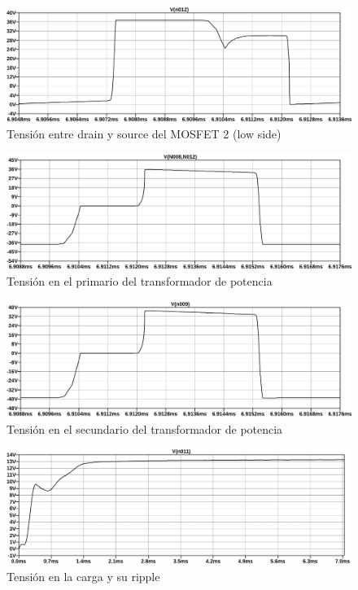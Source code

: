 \begin{figure}[ht]
    \centering
    \includegraphics[width=\textwidth]{images/sim/18.pdf}
    \caption{Tensión entre drain y source del MOSFET 2 (low side)}
    \label{fig:sim:18}
\end{figure}

\begin{figure}[ht]
    \centering
    \includegraphics[width=\textwidth]{images/sim/19.pdf}
    \caption{Tensión en el primario del transformador de potencia}
    \label{fig:sim:19}
\end{figure}

\begin{figure}[ht]
    \centering
    \includegraphics[width=\textwidth]{images/sim/20.pdf}
    \caption{Tensión en el secundario del transformador de potencia}
    \label{fig:sim:20}
\end{figure}

\begin{figure}[ht]
    \centering
    \includegraphics[width=\textwidth]{images/sim/21.pdf}
    \caption{Tensión en la carga y su ripple}
    \label{fig:sim:21}
\end{figure}


